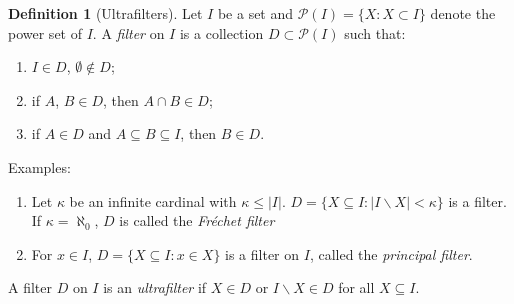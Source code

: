 \documentclass{amsart}
\theoremstyle{definition}
\newtheorem{definition}[theorem]{Definition}
\numberwithin{equation}{section}
\begin{document}
\begin{definition}[Ultrafilters]
    Let $I$ be a set and $\mathcal{P}(I) = \{ X : X \subset I\}$
    denote the power set of $I$.
    A \emph{filter} on $I$ is a collection $D \subset \mathcal{P}(I)$ such that:
    \begin{enumerate}[label = {\roman*)}]
        \item $I \in D$, $\emptyset \not\in D$;
        \item if $A$, $B \in D$, then $A \cap B \in D$;
        \item if $A\in D$ and $A \subseteq B \subseteq I$, then $B \in D$.
    \end{enumerate}
    Examples:
    \begin{enumerate}
        \item Let $\kappa$ be an infinite cardinal with $\kappa \le |I|$. 
        $D = \{ X \subseteq I : |I \backslash X| < \kappa\}$ is a filter.
        If $\kappa = \aleph_0$, $D$ is called the \emph{Fr\'echet filter}
        \item For $x \in I$, $D = \{X\subseteq I: x\in X\}$ is a filter on $I$, called the \emph{principal filter}.
    \end{enumerate}

    A filter $D$ on $I$ is an \emph{ultrafilter} if $X \in D$ or $I\backslash X \in D$ for all $X \subseteq I$.
\end{definition}
\end{document}
